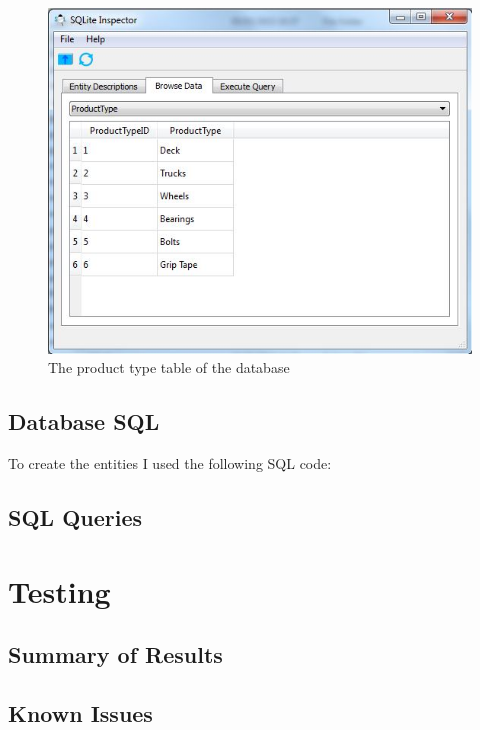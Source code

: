 \begin{figure}[H]
    \includegraphics[width=\textwidth]{./Maintenance/Figures/ProductTypeTable.jpg}
    \caption{The product type table of the database} \label{fig:ProductType Table}
\end{figure}

\subsection{Database SQL}

To create the entities I used the following SQL code:


\subsection{SQL Queries}

\section{Testing}

\subsection{Summary of Results}

\subsection{Known Issues}

